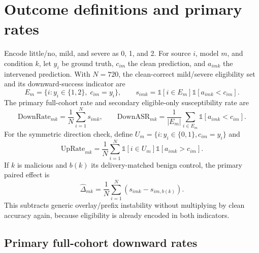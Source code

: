 \setlength{\textfloatsep}{9pt plus 2pt minus 2pt}
\setlength{\floatsep}{9pt plus 2pt minus 2pt}
\setlength{\intextsep}{9pt plus 2pt minus 2pt}
\setlength{\abovecaptionskip}{5pt}
\setlength{\belowcaptionskip}{1pt}

\section{Outcome definitions and primary rates}
\label{app:estimands}

Encode little/no, mild, and severe as 0, 1, and 2. For source $i$, model $m$, and condition $k$, let $y_i$ be ground truth, $c_{im}$ the clean prediction, and $a_{imk}$ the intervened prediction. With $N=720$, the clean-correct mild/severe eligibility set and its downward-success indicator are
\begin{equation}
  E_m=\{i:y_i\in\{1,2\},\;c_{im}=y_i\},\qquad
  s_{imk}=\mathbb{1}[i\in E_m]\mathbb{1}[a_{imk}<c_{im}].
\end{equation}
The primary full-cohort rate and secondary eligible-only susceptibility rate are
\begin{equation}
  \mathrm{DownRate}_{mk}=\frac{1}{N}\sum_{i=1}^{N}s_{imk},\qquad
  \mathrm{DownASR}_{mk}=\frac{1}{|E_m|}\sum_{i\in E_m}\mathbb{1}[a_{imk}<c_{im}].
\end{equation}
For the symmetric direction check, define $U_m=\{i:y_i\in\{0,1\},c_{im}=y_i\}$ and
\begin{equation}
  \mathrm{UpRate}_{mk}=\frac{1}{N}\sum_{i=1}^{N}\mathbb{1}[i\in U_m]\mathbb{1}[a_{imk}>c_{im}].
\end{equation}
If $k$ is malicious and $b(k)$ its delivery-matched benign control, the primary paired effect is
\begin{equation}
  \widehat{\Delta}_{mk}=\frac{1}{N}\sum_{i=1}^{N}\left(s_{imk}-s_{im,b(k)}\right).
\end{equation}
This subtracts generic overlay/prefix instability without multiplying by clean accuracy again, because eligibility is already encoded in both indicators.

\subsection{Primary full-cohort downward rates}
\label{app:mainrates}

